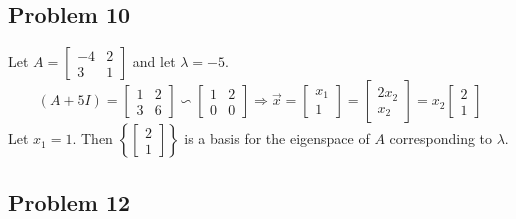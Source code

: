 \documentclass{article}%
\begin{document}
\clearpage
\subsection*{Problem 10}
Let $A =
\begin{bmatrix}
    -4 & 2 \\
    3 & 1
\end{bmatrix}$ and let $\lambda = -5$.
$$
(A+5I) =
\begin{bmatrix}
    1 & 2 \\
    3 & 6
\end{bmatrix}
\backsim
\begin{bmatrix}
    1 & 2 \\
    0 & 0
\end{bmatrix} \Rightarrow
\vec{x} =
\begin{bmatrix}
    x_1 \\ 1
\end{bmatrix}
=
\begin{bmatrix}
    2x_2 \\ x_2
\end{bmatrix}
=
x_2
\begin{bmatrix}
    2 \\ 1
\end{bmatrix}
$$
Let $x_1 = 1$. Then $\left\{\begin{bmatrix} 2 \\ 1 \end{bmatrix}\right\}$ is a basis for the eigenspace of $A$ corresponding to $\lambda$.

\subsection*{Problem 12}
\end{document}
